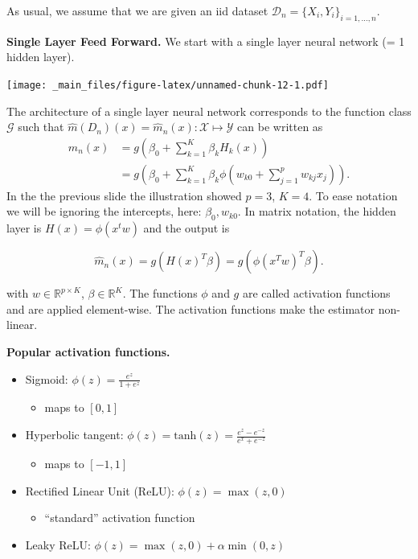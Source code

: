 \documentclass[
]{book}
\providecommand{\tightlist}{%
  \setlength{\itemsep}{0pt}\setlength{\parskip}{0pt}}
\begin{document}
As usual, we assume that we are given an iid dataset \(\mathcal D_n=\{X_i,Y_i\}_{i=1,\dots,n}\).

\textbf{Single Layer Feed Forward.} We start with a single layer neural network (= 1 hidden layer).

\texttt{[image: \_main\_files/figure-latex/unnamed-chunk-12-1.pdf]}

The architecture of a single layer neural network corresponds to
the function class \(\mathcal G\) such that
\(\hat m(D_n)(x)=\hat m_n(x): \mathcal X \mapsto \mathcal Y\) can be written as
\begin{align}
\hat m_n(x)&=g\left(\beta_0 + \sum_{k=1}^{K} \beta_kH_k(x)\right)\\
&= g\left(\beta_0 + \sum_{k=1}^{K} \beta_k\phi\left(w_{k0} + \sum_{j=1}^p w_{kj}x_j\right)\right).
\end{align}
In the the previous slide the illustration showed \(p=3\), \(K=4\). To ease notation we will be ignoring the intercepts, here: \(\beta_0, w_{k0}\). In matrix notation, the hidden layer is \(H(x)=\phi(x^tw)\) and the output is

\[
\hat m_n(x)=g \left( H(x)^T\beta \right)=g\left(\phi(x^Tw)^T\beta\right).
\]

with \(w \in \mathbb R^{p\times K}\), \(\beta \in \mathbb R^{K}\). The functions \(\phi\) and \(g\) are called activation functions and are applied element-wise. The activation functions make the estimator non-linear.

\textbf{Popular activation functions.}

\begin{itemize}
\tightlist
\item
  Sigmoid: \(\phi(z)=\frac{e^z}{1+e^z}\)

  \begin{itemize}
  \tightlist
  \item
    maps to \([0,1]\)
  \end{itemize}
\item
  Hyperbolic tangent: \(\phi(z)=\textrm{tanh}(z)= \frac{e^z-e^{-z}}{e^x+e^{-z}}\)

  \begin{itemize}
  \tightlist
  \item
    maps to \([-1,1]\)
  \end{itemize}
\item
  Rectified Linear Unit (ReLU): \(\phi (z)=\max(z,0)\)

  \begin{itemize}
  \tightlist
  \item
    ``standard'' activation function
  \end{itemize}
\item
  Leaky ReLU: \(\phi (z)=\max(z,0)+ \alpha \min(0,z)\)
\end{itemize}
\end{document}
